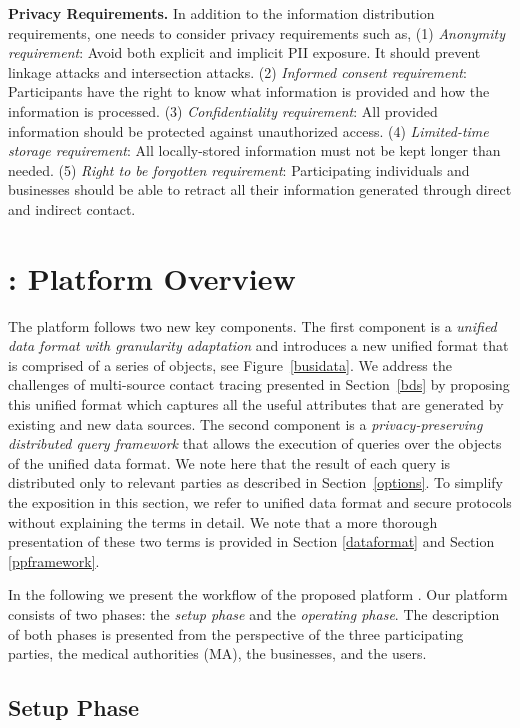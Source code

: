 \textbf{Privacy Requirements. }In addition to the information distribution requirements, one needs to consider privacy requirements such as, (1) \emph{Anonymity requirement}: Avoid both explicit and implicit PII exposure. It should prevent linkage attacks and intersection attacks. 
(2) \emph{Informed consent requirement}: Participants have the right to know what information is provided and how the information is processed. (3) \emph{Confidentiality requirement}: All provided information should be protected against unauthorized access. 
(4) \emph{Limited-time storage requirement}: All locally-stored information must not be kept longer than needed. (5) \emph{Right to be forgotten requirement}: Participating individuals and businesses should be able to retract all their information generated through direct and indirect contact.


\section{\sysname: Platform Overview}
\label{poverview}

The \sysname platform follows two new key components. 
The first component is a \emph{unified data format with granularity adaptation} and introduces a new unified format that is comprised of a series of objects, see Figure~\ref{busidata}.
We address the challenges of multi-source contact tracing presented in Section~\ref{bds} by proposing this unified format which captures all the useful attributes that are generated by existing and new data sources. 
The second component is a \emph{privacy-preserving distributed query framework} that allows the execution of queries over the objects of the unified data format. 
We note here that the result of each query is distributed only to relevant parties as described in Section~\ref{options}. 
To simplify the exposition in this section, we refer to unified data format and secure protocols without explaining the terms in detail. 
We note that a more thorough presentation of these two terms is provided in Section \ref{dataformat} and Section \ref{ppframework}.

In the following we present the workflow of the proposed platform \sysname. 
Our platform consists of two phases: the \emph{setup phase} and the \emph{operating phase}. 
The description of both phases is presented from the perspective of the three participating parties, the medical authorities (MA), the businesses, and the users. 


\subsection{Setup Phase}

